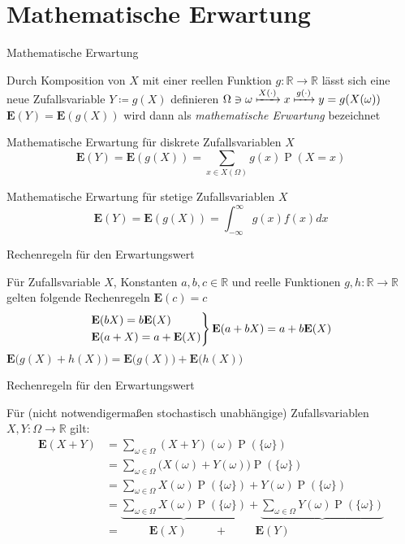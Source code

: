 \documentclass[mathserif]{beamer}
\DeclareMathOperator{\Prob}{P}
\begin{document}
\section{Mathematische Erwartung}
\begin{frame}{Mathematische Erwartung}
    \begin{outline}
        \1 Durch Komposition von $X$ mit einer reellen Funktion $g:\mathbb{R}\rightarrow\mathbb{R}$ lässt sich eine neue Zufallsvariable $Y\coloneqq g(X)$ definieren
        \2 $\Omega\ni\omega\xmapsto{X(\cdot)}x\xmapsto{g(\cdot)}y=g(X(\omega))$
        \1 $\mathbf{E}(Y)=\mathbf{E}(g(X))$ wird dann als \textit{mathematische Erwartung} bezeichnet
    \end{outline}
    \begin{block}{Mathematische Erwartung für diskrete Zufallsvariablen $X$}
        \[\mathbf{E}(Y)=\mathbf{E}(g(X))=\sum_{x\in X(\Omega)}g(x)\Prob(X=x)\]
    \end{block}
    \begin{block}{Mathematische Erwartung für stetige Zufallsvariablen $X$}
        \[\mathbf{E}(Y)=\mathbf{E}(g(X))=\int_{-\infty}^{\infty}g(x)f(x)dx\]
    \end{block}
\end{frame}
\begin{frame}{Rechenregeln für den Erwartungswert}
    \begin{outline}
        \1 Für Zufallsvariable $X$, Konstanten $a,b,c\in\mathbb{R}$ und reelle Funktionen $g,h:\mathbb{R}\rightarrow\mathbb{R}$ gelten folgende Rechenregeln
        \1 $\mathbf{E}(c)=c$
        \1 \[\begin{rcases}
            \mathbf{E}(bX)=b\mathbf{E}(X)\\
            \mathbf{E}(a+X)=a+\mathbf{E}(X)
        \end{rcases} \mathbf{E}(a+bX)=a+b\mathbf{E}(X)\]
        \1 $\mathbf{E}\Big(g(X)+h(X)\Big)=\mathbf{E}\Big(g(X)\Big)+\mathbf{E}\Big(h(X)\Big)$
    \end{outline}
\end{frame}
\begin{frame}{Rechenregeln für den Erwartungswert}
    \begin{outline}
        \1 Für (nicht notwendigermaßen stochastisch unabhängige) Zufallsvariablen $X,Y:\Omega\longrightarrow\mathbb{R}$ gilt:\begin{align*}
            \mathbf{E}(X+Y)&=\sum_{\omega\in\Omega}(X+Y)(\omega)\Prob(\{\omega\})\\
            &=\sum_{\omega\in\Omega}\Big(X(\omega)+Y(\omega)\Big)\Prob(\{\omega\})\\
            &=\sum_{\omega\in\Omega}X(\omega)\Prob(\{\omega\})+Y(\omega)\Prob(\{\omega\})\\
            &=\underbrace{\sum_{\omega\in\Omega}X(\omega)\Prob(\{\omega\})}+\underbrace{\sum_{\omega\in\Omega}Y(\omega)\Prob(\{\omega\})}\\
            &=\;\;\;\;\;\;\;\;\;\mathbf{E}(X)\;\;\;\;\;\;\;\:\:+\;\;\;\;\;\;\;\:\:\mathbf{E}(Y)
        \end{align*}
    \end{outline}
\end{frame}
\end{document}
